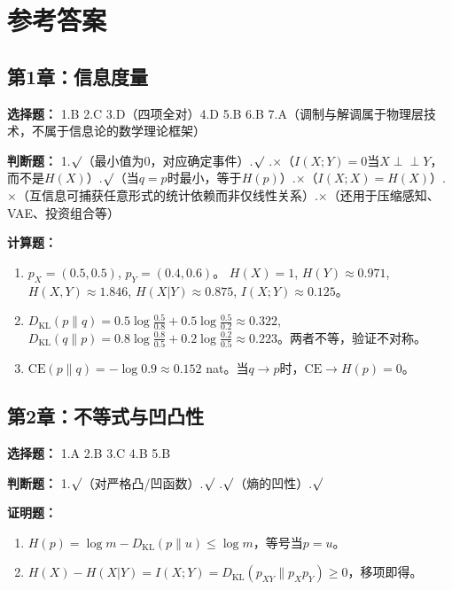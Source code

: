 \documentclass[12pt,a4paper]{ctexart}
\newcommand{\DKL}{D_{\mathrm{KL}}}
\newcommand{\indep}{\perp\!\!\!\perp}
\begin{document}
\section*{参考答案}

\subsection*{第1章：信息度量}

\textbf{选择题：} 1.B \quad 2.C \quad 3.D（四项全对）\quad 4.D \quad 5.B \quad 6.B \quad 7.A（调制与解调属于物理层技术，不属于信息论的数学理论框架）

\textbf{判断题：} 1.$\surd$（最小值为0，对应确定事件）.$\surd$ .$\times$（$I(X;Y)=0$当$X\indep Y$，而不是$H(X)$）.$\surd$（当$q=p$时最小，等于$H(p)$）.$\times$（$I(X;X)=H(X)$）.$\times$（互信息可捕获任意形式的统计依赖而非仅线性关系）.$\times$（还用于压缩感知、VAE、投资组合等）

\textbf{计算题：}
\begin{enumerate}[leftmargin=*]
\item[(1)] $p_X=(0.5,0.5)$, $p_Y=(0.4,0.6)$。
$H(X)=1$, $H(Y)\approx0.971$, $H(X,Y)\approx1.846$, $H(X|Y)\approx0.875$, $I(X;Y)\approx0.125$。
\item[(2)] $\DKL(p\|q)=0.5\log\frac{0.5}{0.8}+0.5\log\frac{0.5}{0.2}\approx0.322$,
$\DKL(q\|p)=0.8\log\frac{0.8}{0.5}+0.2\log\frac{0.2}{0.5}\approx0.223$。两者不等，验证不对称。
\item[(3)] $\mathrm{CE}(p\|q)=-\log 0.9\approx0.152$ nat。当$q\to p$时，$\mathrm{CE}\to H(p)=0$。
\end{enumerate}

\subsection*{第2章：不等式与凹凸性}

\textbf{选择题：} 1.A \quad 2.B \quad 3.C \quad 4.B \quad 5.B

\textbf{判断题：} 1.$\surd$（对严格凸/凹函数）.$\surd$ .$\surd$（熵的凹性）.$\surd$

\textbf{证明题：}
\begin{enumerate}[leftmargin=*]
\item[(1)] $H(p)=\log m-\DKL(p\|u)\leq\log m$，等号当$p=u$。
\item[(2)] $H(X)-H(X|Y)=I(X;Y)=\DKL(p_{XY}\|p_X p_Y)\geq0$，移项即得。
\end{enumerate}
\end{document}
